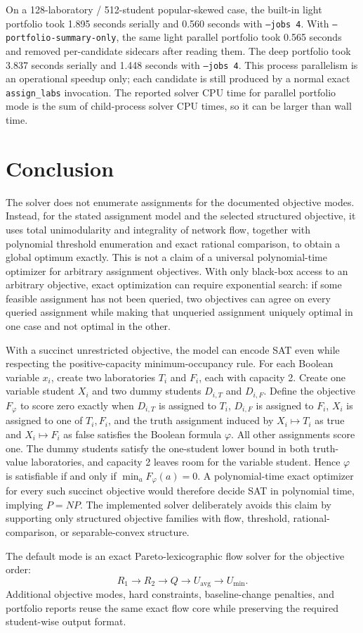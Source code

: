 \documentclass[11pt,a4paper]{article}
\begin{document}
On a 128-laboratory / 512-student popular-skewed case, the built-in light
portfolio took 1.895 seconds serially and 0.560 seconds with
\texttt{--jobs 4}.  With \texttt{--portfolio-summary-only}, the same light
parallel portfolio took 0.565 seconds and removed per-candidate sidecars after
reading them.  The deep portfolio took 3.837 seconds serially and 1.448 seconds
with \texttt{--jobs 4}.  This process parallelism is an
operational speedup only; each candidate is still produced by a normal exact
\texttt{assign\_labs} invocation.  The reported solver CPU time for parallel
portfolio mode is the sum of child-process solver CPU times, so it can be
larger than wall time.

\section{Conclusion}

The solver does not enumerate assignments for the documented objective modes.
Instead, for the stated assignment model and the selected structured
objective, it uses total unimodularity and integrality of network flow,
together with polynomial threshold enumeration and exact rational comparison,
to obtain a global optimum exactly.  This is not a claim of a universal
polynomial-time optimizer for arbitrary assignment objectives.  With only
black-box access to an arbitrary objective, exact optimization can require
exponential search: if some feasible assignment has not been queried, two
objectives can agree on every queried assignment while making that unqueried
assignment uniquely optimal in one case and not optimal in the other.

With a succinct unrestricted objective, the model can encode SAT even while
respecting the positive-capacity minimum-occupancy rule.  For each Boolean
variable \(x_i\), create two laboratories \(T_i\) and \(F_i\), each with
capacity 2.  Create one variable student \(X_i\) and two dummy students
\(D_{i,T}\) and \(D_{i,F}\).  Define the objective \(F_\varphi\) to score zero
exactly when \(D_{i,T}\) is assigned to \(T_i\), \(D_{i,F}\) is assigned to
\(F_i\), \(X_i\) is assigned to one of \(T_i,F_i\), and the truth assignment
induced by \(X_i\mapsto T_i\) as true and \(X_i\mapsto F_i\) as false satisfies
the Boolean formula \(\varphi\).  All other assignments score one.  The dummy
students satisfy the one-student lower bound in both truth-value laboratories,
and capacity 2 leaves room for the variable student.  Hence
\(\varphi\) is satisfiable if and only if \(\min_a F_\varphi(a)=0\).  A
polynomial-time exact optimizer for every such succinct objective would
therefore decide SAT in polynomial time, implying \(P=NP\).  The implemented
solver deliberately avoids this claim by supporting only structured objective
families with flow, threshold, rational-comparison, or separable-convex
structure.

The default mode is an exact Pareto-lexicographic flow solver for the
objective order:
\[
  R_1 \rightarrow R_2 \rightarrow Q \rightarrow U_{\mathrm{avg}}
  \rightarrow U_{\min}.
\]
Additional objective modes, hard constraints, baseline-change penalties, and
portfolio reports reuse the same exact flow core while preserving the required
student-wise output format.
\end{document}
